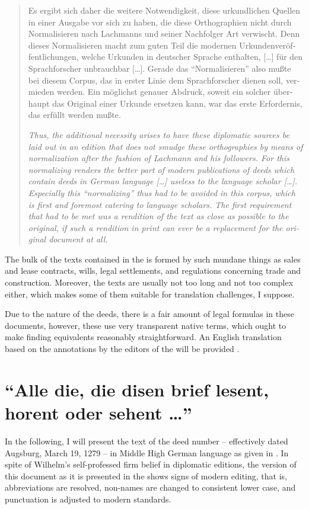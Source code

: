 \documentclass[12pt,paper=a4]{scrartcl}
\begin{document}
\foreignblockquote{german}{\begin{multicols}{2}Es ergibt sich daher die weitere 
Notwendigkeit, diese urkundlichen Quellen in einer Ausgabe vor sich zu haben, 
die diese Orthographien nicht durch Normalisieren nach Lachmanns und seiner 
Nachfolger Art verwischt. Denn dieses Normalisieren macht zum guten Teil die 
modernen Urkundenveröffentlichungen, welche Urkunden in deutscher Sprache 
ent\-halten, […] für den Sprachforscher un\-brauch\-bar […]. Gerade das 
\enquote{Normalisieren} also mußte bei diesem Corpus, das in erster Linie dem 
Sprachforscher dienen soll, vermieden werden. Ein möglichst genauer Abdruck, 
soweit ein solcher überhaupt das Original einer Urkunde ersetzen kann, war das 
erste Erfordernis, das erfüllt werden mußte. \autocite[LX]{CAO1}

\columnbreak

{\itshape Thus, the additional necessity arises to have these diplomatic sources 
be laid out in an edition that does not smudge these orthographies by means of 
normalization after the fashion of Lachmann and his followers. For this 
normalizing renders the better part of modern publications of deeds which 
contain deeds in German language […] useless to the language scholar […]. 
Especially this \enquote{normalizing} thus had to be avoided in this corpus, 
which is first and foremost catering to language scholars. The first requirement 
that had to be met was a rendition of the text as close as possible to the 
original, if such a rendition in print can ever be a replacement for the 
original document at all.}\end{multicols}}

The bulk of the texts contained in the  is formed by such mundane 
things as sales and lease contracts, wills, legal settlements, and regulations 
concerning trade and construction. Moreover, the texts are usually not too long 
and not too complex either, which makes some of them suitable for translation 
challenges, I suppose.

Due to the nature of the deeds, there is a fair amount of legal formulas in 
these documents, however, these use very transparent native terms, which ought 
to make finding equivalents reasonably straightforward. An English translation 
based on the annotations by the editors of the  will be provided 
\autocite[see][]{n163-online}.

\section{\enquote{Alle die, die disen brief lesent, horent oder sehent …}}
In the following, I will present the text of the deed number 
 -- effectively dated Augsburg, March 19, 1279 -- in 
Middle High German language as given in \textcites{n163}{n163-online}. In spite 
of Wilhelm's self-professed firm belief in diplomatic editions, the version of 
this document as it is presented in the  shows signs of modern 
editing, that is, abbreviations are resolved, non-names are changed to 
consistent lower case, and punctuation is adjusted to modern standards.
\end{document}
